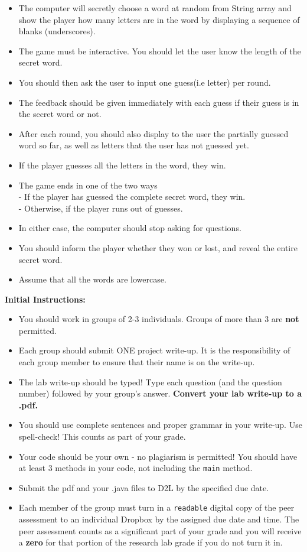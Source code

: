 \documentclass[12pt]{article}
\begin{document}
\begin{itemize}
	\item The computer will secretly choose a word at random from String array and show the player how many letters are in the word by displaying a sequence of blanks (underscores). 
	\item The game must be interactive. You should let the user know the length of the secret word.
	\item You should then ask the user to input one guess(i.e letter) per round.
	\item The feedback should be given immediately with each guess if their guess is in the secret word or not.
	\item  After each round, you should also display to the user the partially guessed word so far, as well as letters that the user has not guessed yet.
	\item If the player guesses all the letters in the word, they win. 
	\item The game ends in one of the two ways\\
	- If the player has guessed the complete secret word, they win.\\
	- Otherwise, if the player runs out of guesses.
	\item In either case, the computer should stop asking for questions.
	\item You should inform the player whether they won or lost, and reveal the entire secret word.
	\item Assume that all the words are lowercase.
\end{itemize}
\vspace*{0.5cm}
\noindent\textbf{Initial Instructions:}
\begin{itemize}
	\item You should work in groups of 2-3 individuals. Groups of more than 3 are \textbf{not} permitted.
	\item Each group should submit ONE project write-up. It is the responsibility of each group member to ensure that their name is on the write-up.
	\item The lab write-up should be typed! Type each question (and the question number) followed by your group's answer. \textbf{Convert your lab write-up to a .pdf.}
	\item You should use complete sentences and proper grammar in your write-up. Use spell-check! This counts as part of your grade.
	\item Your code should be your own - no plagiarism is permitted! You should have at least 3 methods in your code, not including the \texttt{main} method.
	\item Submit the pdf and your .java files to D2L by the specified due date.
	\item Each member of the group must turn in a \texttt{readable} digital copy of the peer assessment to an individual Dropbox by the assigned due date and time. The peer assessment counts as a significant part of your grade and you will receive a \textbf{zero} for that portion of the research lab grade if you do not turn it in. 
\end{itemize}
\end{document}
